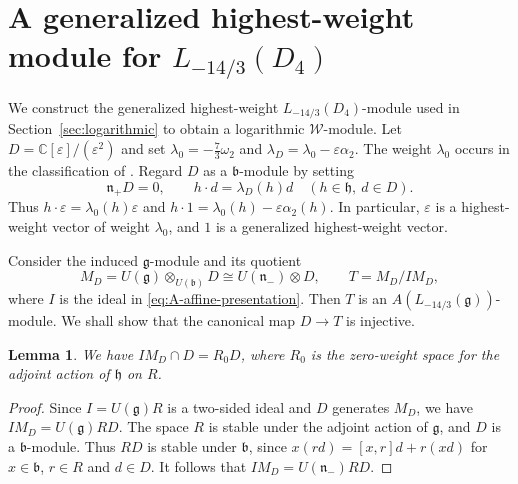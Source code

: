 \documentclass[11pt]{amsart}
\numberwithin{equation}{section}
\newtheorem{lemma}[theorem]{Lemma}
\theoremstyle{definition}
\theoremstyle{remark}
\newcommand{\CC}{\mathbb C}
\newcommand{\g}{\mathfrak g}
\newcommand{\n}{\mathfrak n}
\newcommand{\h}{\mathfrak h}
\newcommand{\bfr}{\mathfrak b}
\newcommand{\nminus}{\mathfrak n_-}
\begin{document}
\section{A generalized highest-weight module for \texorpdfstring{$L_{-14/3}(D_4)$}{L(-14/3)(D4)}}
\label{sec:generalized}
{We construct the generalized highest-weight $L_{-14/3}(D_4)$-module used
in Section~\ref{sec:logarithmic} to obtain a logarithmic $\mathcal W$-module.
Let $D=\CC[\varepsilon]/(\varepsilon^2)$ and set
$\lambda_0=-\tfrac73\omega_2$ and $\lambda_D=\lambda_0-\varepsilon\alpha_2$.
The weight $\lambda_0$ occurs in the classification of \cite{AV}.
Regard $D$ as a $\bfr$-module by setting
\[
 \n_+D=0,\qquad h\cdot d=\lambda_D(h)d
 \quad(h\in\h,\ d\in D).
\]
Thus $h\cdot\varepsilon=\lambda_0(h)\varepsilon$ and
$h\cdot 1=\lambda_0(h)-\varepsilon\alpha_2(h)$.
In particular, $\varepsilon$ is a highest-weight vector of weight
$\lambda_0$, and $1$ is a generalized highest-weight vector.

Consider the induced $\g$-module and its quotient
\[
 M_D=U(\g)\otimes_{U(\bfr)}D\cong U(\n_-)\otimes D,
 \qquad T=M_D/IM_D,
\]
where $I$ is the ideal in \eqref{eq:A-affine-presentation}.
Then $T$ is an $A(L_{-14/3}(\g))$-module. We shall show that the
canonical map $D\longrightarrow T$ is injective.
	\begin{lemma}\label{lem:R0}
We have $IM_D\cap D=R_0D$, where $R_0$ is the zero-weight space for the adjoint action of $\h$ on $R$.
	\end{lemma}
    \begin{proof}
Since $I=U(\g)R$ is a two-sided ideal and $D$ generates $M_D$,
we have $IM_D=U(\g)RD$. The space $R$ is stable under the
adjoint action of $\g$, and $D$ is a $\bfr$-module. Thus $RD$ is
stable under $\bfr$, since $x(rd)=[x,r]d+r(xd)$ for $x\in\bfr$,
$r\in R$ and $d\in D$. It follows that $IM_D=U(\nminus)RD$.


\end{proof}}
\end{document}
